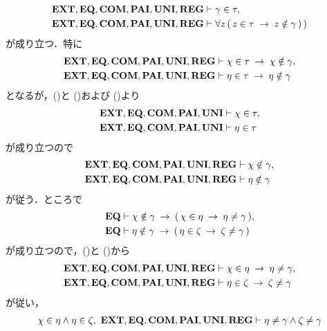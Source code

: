 \begin{sketch}
\begin{align}
			\EXTAX,\EQAX,\COMAX,\PAIAX,\UNIAX,\REGAX &\vdash \gamma \in \tau, 
			\label{fom:no_three_sets_go_round_13} \\
			\EXTAX,\EQAX,\COMAX,\PAIAX,\UNIAX,\REGAX &\vdash \forall z\, (\, z \in \tau \rarrow z \notin \gamma\, )\, )
			\label{fom:no_three_sets_go_round_14}
		\end{align}
		が成り立つ．特に
		\begin{align}
			\mbox{{\bf EXT}},\mbox{{\bf EQ}},\mbox{\bf COM},\mbox{{\bf PAI}},\mbox{{\bf UNI}},\mbox{{\bf REG}} &\vdash \chi \in \tau \hspace{0.25em}\rightarrow\hspace{0.25em} \chi \notin \gamma, \\
			\mbox{{\bf EXT}},\mbox{{\bf EQ}},\mbox{\bf COM},\mbox{{\bf PAI}},\mbox{{\bf UNI}},\mbox{{\bf REG}} &\vdash \eta \in \tau \hspace{0.25em}\rightarrow\hspace{0.25em} \eta \notin \gamma
		\end{align}
		となるが，()と
		()および
		()より
		\begin{align}
			\mbox{{\bf EXT}},\mbox{{\bf EQ}},\mbox{\bf COM},\mbox{{\bf PAI}},\mbox{{\bf UNI}} &\vdash \chi \in \tau, \\
			\mbox{{\bf EXT}},\mbox{{\bf EQ}},\mbox{\bf COM},\mbox{{\bf PAI}},\mbox{{\bf UNI}} &\vdash \eta \in \tau
		\end{align}
		が成り立つので
		\begin{align}
			\EXTAX,\EQAX,\COMAX,\PAIAX,\UNIAX,\REGAX &\vdash \chi \notin \gamma, 
			\label{fom:no_three_sets_go_round_15} \\
			\EXTAX,\EQAX,\COMAX,\PAIAX,\UNIAX,\REGAX &\vdash \eta \notin \gamma
			\label{fom:no_three_sets_go_round_16}
		\end{align}
		が従う．ところで
		\begin{align}
			\mbox{{\bf EQ}} &\vdash \chi \notin \gamma \hspace{0.25em}\rightarrow\hspace{0.25em} (\, \chi \in \eta \hspace{0.25em}\rightarrow\hspace{0.25em} \eta \neq \gamma\, ), \\
			\mbox{{\bf EQ}} &\vdash \eta \notin \gamma \hspace{0.25em}\rightarrow\hspace{0.25em} (\, \eta \in \zeta \hspace{0.25em}\rightarrow\hspace{0.25em} \zeta \neq \gamma\, )
		\end{align}
		が成り立つので，()と
		()から
		\begin{align}
			\EXTAX,\EQAX,\COMAX,\PAIAX,\UNIAX,\REGAX &\vdash \chi \in \eta \rarrow \eta \neq \gamma, 
			\label{fom:no_three_sets_go_round_17} \\
			\EXTAX,\EQAX,\COMAX,\PAIAX,\UNIAX,\REGAX &\vdash \eta \in \zeta \rarrow \zeta \neq \gamma
			\label{fom:no_three_sets_go_round_18}
		\end{align}
		が従い，
		\begin{align}
			\chi \in \eta \wedge \eta \in \zeta,\ 
			\EXTAX,\EQAX,\COMAX,\PAIAX,\UNIAX,\REGAX \vdash \eta \neq \gamma \wedge \zeta \neq \gamma

\end{align}
\end{sketch}
